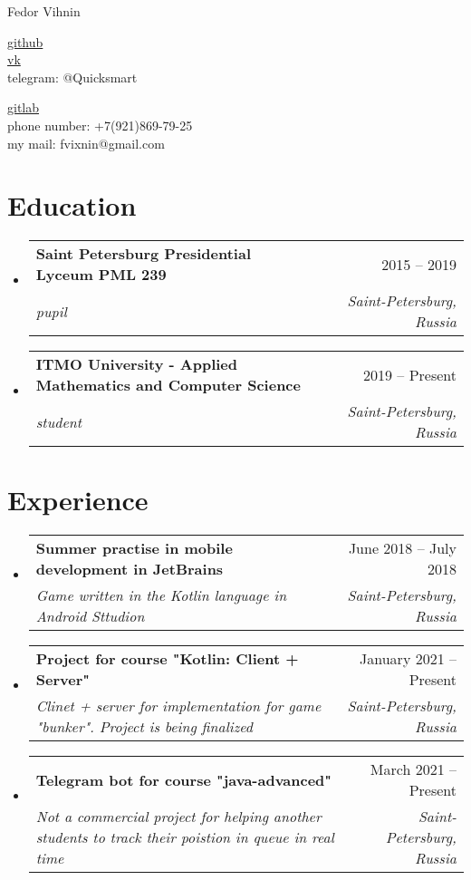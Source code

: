 \documentclass[letterpaper,10pt]{article}
\makeatletter
\newcommand{\resumeSubheading}[4]{
  \vspace{-2pt}\item
    \begin{tabular*}{0.97\textwidth}[t]{l@{\extracolsep{\fill}}r}
      \textbf{#1} & #2 \\
      \textit{\small#3} & \textit{\small #4} \\
    \end{tabular*}\vspace{-7pt}
}
\newcommand{\resumeSubHeadingListStart}{\begin{itemize}[leftmargin=0.15in, label={}]}
\newcommand{\resumeSubHeadingListEnd}{\end{itemize}}
\makeatother
\begin{document}
\begin{center}
    {\LARGE Fedor Vihnin} \\ \vspace{2pt}
    \begin{multicols}{2}
    \begin{flushleft}
    \href{https://github.com/Brat-vseznamus}{github}\\
    \href{https://vk.com/looongboooi}{vk}\\
    telegram: @Quicksmart
    \end{flushleft}
    
    \begin{flushright}
    \href{https://gitlab.com/Brat-vseznamus}{gitlab}\\
    phone number: +7(921)869-79-25\\
    my mail: fvixnin@gmail.com
    \end{flushright}
    \end{multicols}
\end{center}


\vspace{-2pt}
\section{Education}
    \resumeSubHeadingListStart
        \resumeSubheading
        {Saint Petersburg Presidential Lyceum PML 239
        }{2015 -- 2019}
        {pupil}{Saint-Petersburg, Russia}

    \resumeSubHeadingListEnd
  \resumeSubHeadingListStart
      \resumeSubheading
      {ITMO University - Applied Mathematics and Computer Science}{2019 -- Present}
      {student}{Saint-Petersburg, Russia}

  \resumeSubHeadingListEnd


\section{Experience}
  \resumeSubHeadingListStart
    \resumeSubheading
      {Summer practise in mobile development in JetBrains}{June 2018 -- July 2018}
      {Game written in the Kotlin language in Android Sttudion}{Saint-Petersburg, Russia}
  \resumeSubHeadingListEnd
  \resumeSubHeadingListStart
    \resumeSubheading
      {Project for course "Kotlin: Client + Server"}{January 2021 -- Present}
      {Clinet + server for implementation for game "bunker". Project is being finalized}{Saint-Petersburg, Russia}
  \resumeSubHeadingListEnd
  \resumeSubHeadingListStart
    \resumeSubheading
      {Telegram bot for course "java-advanced"}{March 2021 -- Present}
      {Not a commercial project for helping another students to track their poistion in queue in real time}{Saint-Petersburg, Russia}
  \resumeSubHeadingListEnd
\end{document}
